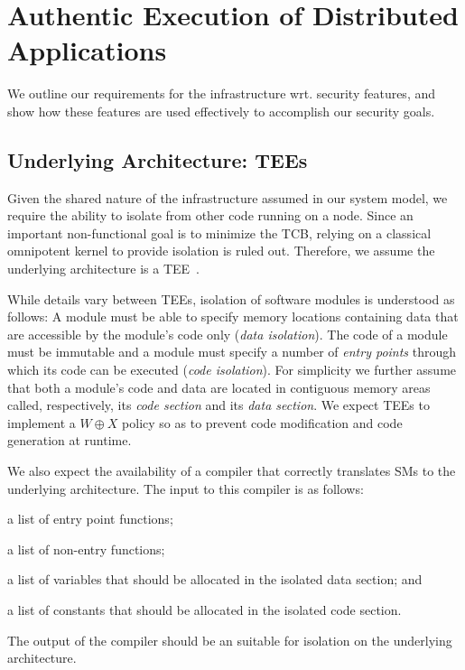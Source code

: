 \section{Authentic Execution of Distributed Applications}
\label{sec:design}

We outline our requirements for the infrastructure wrt. security features,
and show how these features are used effectively to accomplish our security
goals.

\subsection{Underlying Architecture: \acp{TEE}}
\label{design:tee}
%
Given the shared nature of the infrastructure assumed in our system model, we
require the ability to isolate \reactmods{} from other code running on a node.
Since an important non-functional goal is to minimize the \ac{TCB}, relying on a
classical omnipotent kernel to provide isolation is ruled out. Therefore, we
assume the underlying architecture is a \ac{TEE}~\cite{pma}.

\label{concept:isolation} While details vary between \acp{TEE}, isolation
of software modules is understood as follows: A module must be able to
specify memory locations containing data that are accessible by the
module's code only (\emph{data isolation}).  The code of a module must be
immutable and a module must specify a number of \emph{entry points} through
which its code can be executed (\emph{code isolation}).  For simplicity we
further assume that both a module's code and data are located in contiguous
memory areas called, respectively, its \emph{code section} and its
\emph{data section}. We expect \acp{TEE} to implement a $W\oplus X$ policy
so as to prevent code modification and code generation at runtime.

\label{concept:pma-compiler} We also expect the availability of a compiler
that correctly translates \acfp{SM} to the underlying
architecture. The input to this compiler is as follows:
%
\begin{paraenum}
%
  \item \label{compiler-input:entries} a list of entry point functions;
%
  \item \label{compiler-input:non-entries} a list of non-entry functions;
%
  \item \label{compiler-input:vars} a list of variables that should be
allocated in the isolated data section; and
%
  \item \label{compiler-input:consts} a list of constants that should be
allocated in the isolated code section.
%
\end{paraenum}
%
The output of the compiler should be an \protmod{} suitable for isolation on
the underlying architecture.

